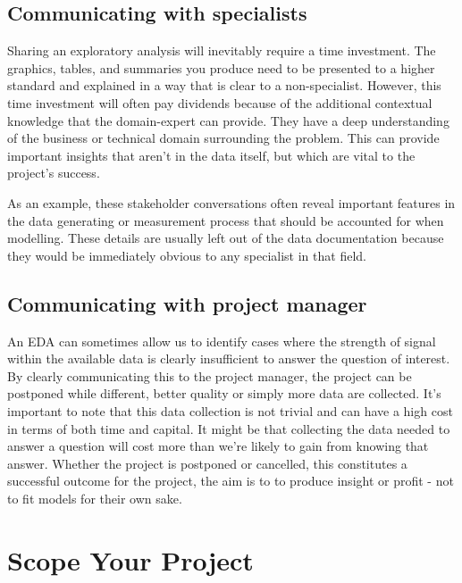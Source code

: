 \documentclass[
  12pt,
]{book}
\begin{document}
\hypertarget{communicating-with-specialists}{%
\subsection{Communicating with specialists}\label{communicating-with-specialists}}

Sharing an exploratory analysis will inevitably require a time investment. The graphics, tables, and summaries you produce need to be presented to a higher standard and explained in a way that is clear to a non-specialist. However, this time investment will often pay dividends because of the additional contextual knowledge that the domain-expert can provide. They have a deep understanding of the business or technical domain surrounding the problem. This can provide important insights that aren't in the data itself, but which are vital to the project's success.

As an example, these stakeholder conversations often reveal important features in the data generating or measurement process that should be accounted for when modelling. These details are usually left out of the data documentation because they would be immediately obvious to any specialist in that field.

\hypertarget{communicating-with-project-manager}{%
\subsection{Communicating with project manager}\label{communicating-with-project-manager}}

An EDA can sometimes allow us to identify cases where the strength of signal within the available data is clearly insufficient to answer the question of interest. By clearly communicating this to the project manager, the project can be postponed while different, better quality or simply more data are collected. It's important to note that this data collection is not trivial and can have a high cost in terms of both time and capital. It might be that collecting the data needed to answer a question will cost more than we're likely to gain from knowing that answer. Whether the project is postponed or cancelled, this constitutes a successful outcome for the project, the aim is to to produce insight or profit - not to fit models for their own sake.

\hypertarget{scope-your-project}{%
\section{Scope Your Project}\label{scope-your-project}}
\end{document}
